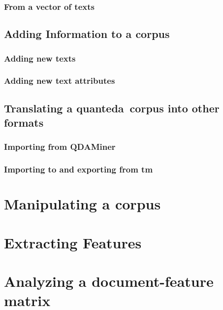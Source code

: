 \documentclass[11pt]{article}\usepackage[]{graphicx}\usepackage[]{color}
\newcommand{\quanteda}{\textsf{quanteda}\ }
\begin{document}
\subsubsection{From a vector of texts}


\subsection{Adding Information to a corpus}

\subsubsection{Adding new texts}

\subsubsection{Adding new text attributes}


\subsection{Translating a \quanteda corpus into other formats}

\subsubsection{Importing from QDAMiner}

\subsubsection{Importing to and exporting from \textsf{tm}}


\section{Manipulating a corpus}


\section{Extracting Features}


\section{Analyzing a document-feature matrix}


\end{document}
